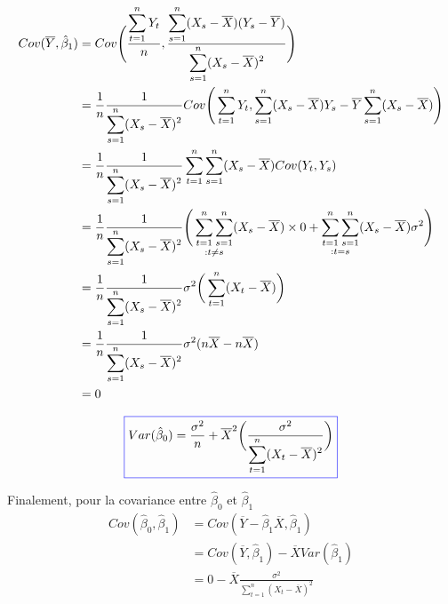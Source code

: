 \documentclass[11pt,french]{report}
\begin{document}
\begin{align*}
Cov(\overline{Y}, \hat{\beta}_1) &= Cov \Bigg( \frac{\displaystyle\displaystyle\sum_{t=1}^n Y_t}{n}, \frac{\displaystyle\displaystyle\sum_{s=1}^n(X_s- \overline{X})(Y_s - \overline{Y})}{\displaystyle\displaystyle\sum_{s=1}^n(X_s - \overline{X})^2} \Bigg) \\
&= \frac{1}{n}\frac{1}{\displaystyle\displaystyle\sum_{s=1}^n(X_s - \overline{X})^2} Cov\Bigg(\displaystyle\displaystyle\sum_{t=1}^n Y_t, \displaystyle\displaystyle\sum_{s=1}^n(X_s- \overline{X})Y_s - \overline{Y}\displaystyle\displaystyle\sum_{s=1}^n(X_s- \overline{X}) \Bigg) \\
&= \frac{1}{n}\frac{1}{\displaystyle\displaystyle\sum_{s=1}^n(X_s - \overline{X})^2} \displaystyle\sum_{t=1}^n \displaystyle\sum_{s=1}^n (X_s- \overline{X}) Cov(Y_t, Y_s) \\
&= \frac{1}{n}\frac{1}{\displaystyle\sum_{s=1}^n(X_s - \overline{X})^2} \Bigg( \mathop{\displaystyle\sum_{t=1}^n \displaystyle\sum_{s=1}^n}_{:t \neq s} (X_s- \overline{X}) \times 0 + \mathop{\displaystyle\sum_{t=1}^n \displaystyle\sum_{s=1}^n}_{:t = s} (X_s- \overline{X}) \sigma^2 \Bigg) \\
&= \frac{1}{n}\frac{1}{\displaystyle\sum_{s=1}^n(X_s - \overline{X})^2}\sigma^2 \bigg( \displaystyle\sum_{t=1}^n (X_t - \overline{X}) \bigg) \\
&= \frac{1}{n}\frac{1}{\displaystyle\sum_{s=1}^n(X_s - \overline{X})^2}\sigma^2 (n\overline{X}- n\overline{X}) \\
&= 0
\end{align*}

\begin{equation}
\label{eq:varbeta0}
\color{blue}
\boxed{\color{black}
Var(\hat{\beta}_0) = \frac{\sigma^2}{n}  + \overline{X}^2 \bigg(\frac{\sigma^2}{\displaystyle\sum_{t=1}^n (X_t - \overline{X})^2}\bigg)}
\end{equation}

Finalement, pour la covariance entre $\hat{\beta}_0$ et $\hat{\beta}_1$
\begin{align*}
Cov(\hat{\beta}_0, \hat{\beta}_1) &= Cov(\overline{Y} - \hat{\beta}_1\overline{X}, \hat{\beta}_1) \\
&= Cov(\overline{Y},  \hat{\beta}_1) - \overline{X} Var(\hat{\beta}_1) \\
&= 0 - \overline{X} \frac{\sigma^2}{\displaystyle\sum_{t=1}^n (X_t - \overline{X})^2} \\
\end{align*}
\end{document}

